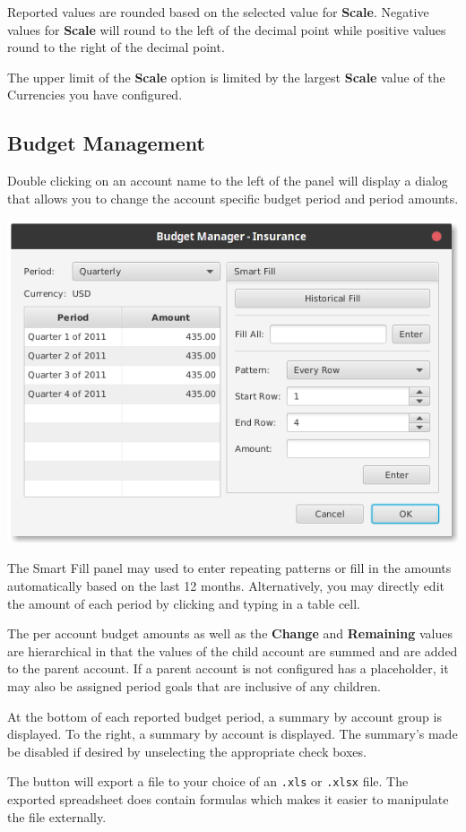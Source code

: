 \documentclass[letterpaper,12pt]{book}
\begin{document}
    Reported values are rounded based on the selected value for \textbf{Scale}. Negative values for \textbf{Scale} will round to the
    left of the decimal point while positive values round to the right of the decimal point.

    The upper limit of the \textbf{Scale} option is limited by the largest \textbf{Scale} value of the Currencies you have configured.
    \newpage
    \subsection{Budget Management}
    Double clicking on an account name to the left of the panel will display a dialog that allows you to change the account
    specific budget period and period amounts.

    \includegraphics[width=0.8\linewidth]{images/budget-goal-dialog}

    The Smart Fill panel may used to enter repeating patterns or fill in the amounts automatically based on the last 12 months.
    Alternatively, you may directly edit the amount of each period by clicking and typing in a table cell.

    The per account budget amounts as well as the \textbf{Change} and \textbf{Remaining} values are hierarchical in that the values of the child account
    are summed and are added to the parent account. If a parent account is not configured has a placeholder, it may also be assigned
    period goals that are inclusive of any children.

    At the bottom of each reported budget period, a summary by account group is displayed.
    To the right, a summary by account is displayed.
    The summary's made be disabled if desired by unselecting the appropriate check boxes.

    The  button will export a file to your choice of an \texttt{.xls} or \texttt{.xlsx} file.
    The exported spreadsheet does contain formulas which makes it easier to manipulate the file externally.
\end{document}
